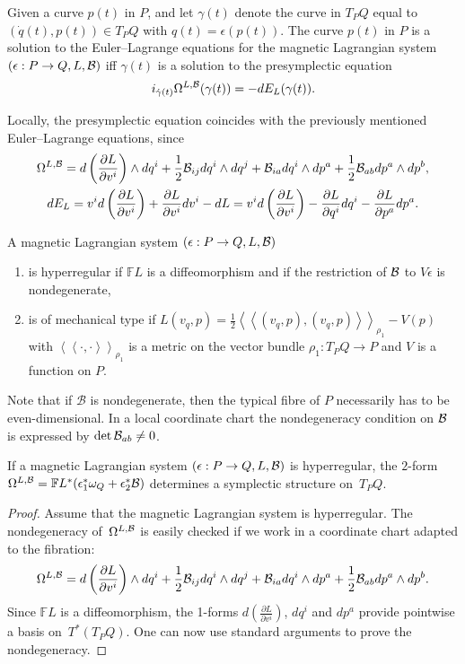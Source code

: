 \documentclass[pdftex]{sigma}
\renewcommand{\ll}{\left<\!\left<}
\renewcommand{\gg}{\right>\!\right>}
\newcommand{\B}{{\cal B}}
\newcommand{\e}{\epsilon}
\def\fpd#1#2{\frac{\partial #1}{\partial #2}}
\newcommand{\F}{\mathbb{F}}
\begin{document}
\begin{proposition}\label{def:el} Given a curve $p(t)$ in $P$, and let $\gamma(t)$ denote the curve in $T_PQ$ equal to $(\dot q(t), p(t))\in T_PQ$ with $q(t)=\e(p(t))$. The curve $p(t)$ in $P$ is a solution to the Euler--Lagrange equations for the magnetic Lagrangian system $(\e:P\to Q,L,\B)$ iff  $\gamma(t)$ is a solution to the presymplectic equation
\[i_{\dot \gamma(t)} \Omega^{L,\B} (\gamma(t)) = -dE_L(\gamma(t)).\]
\end{proposition}
Locally, the presymplectic equation coincides with the previously mentioned Euler--Lagrange equations, since
\begin{gather*}
\Omega^{L,\B}  = d\left(\fpd{L}{v^i} \right)\wedge d q^i + \frac12 \B_{ij} dq^i \wedge dq^j + \B_{ia}dq^i\wedge dp^a + \frac12 \B_{ab} dp^a\wedge dp^b,\\
 dE_L   =v^i d\left(\fpd{L}{v^i} \right) + \fpd{L}{v^i} dv^i - dL=v^i d\left(\fpd{L}{v^i} \right) - \fpd{L}{q^i} dq^i - \fpd{L}{p^a} dp^a.
\end{gather*}

\begin{definition}A magnetic Lagrangian system $(\e:P\to Q,L,\B)$
\begin{enumerate}\itemsep=0pt \item[1)] is hyperregular if $\F L$ is  a dif\/feomorphism and if the restriction of $\B$ to $V\e$ is nondegenerate,
 \item[2)] is of mechanical type if $L(v_q,p)= \frac12 \ll (v_q,p) ,(v_q,p)\gg_{\rho_1}- V(p)$ with $\ll \cdot , \cdot \gg_{\rho_1}$ is a metric on the vector bundle $\rho_1:T_PQ \to P$ and $V$ is a function on $P$. \end{enumerate}
\end{definition}

Note that if $\mathcal{B}$ is nondegenerate, then the typical f\/ibre of $P$ necessarily has to be even-dimensional.
In a local coordinate chart the nondegeneracy condition on $\B$ is expressed by $\det \B_{ab}\neq0$.
\begin{proposition} If a magnetic Lagrangian system $(\e:P\to Q,L,\B)$ is hyperregular, the $2$-form $\Omega^{L,\B} = \F L^*(\e^*_1\omega_{Q} +\e^*_2\B)$ determines a symplectic structure on~$T_PQ$.
\end{proposition}
\begin{proof}
Assume that the magnetic Lagrangian system is hyperregular. The nondegeneracy of~$\Omega^{L,\B}$ is easily checked if we work in a coordinate chart adapted to the f\/ibration:
\[
\Omega^{L,\B} = d\left(\fpd{L}{v^i} \right)\wedge d q^i + \frac12 \B_{ij} dq^i \wedge dq^j + \B_{ia}dq^i\wedge dp^a + \frac12 \B_{ab} dp^a\wedge dp^b.
\]
Since $\F L$ is a dif\/feomorphism, the 1-forms $d\left(\fpd{L}{v^i} \right)$, $dq^i$ and $dp^a$ provide pointwise a basis on~$T^*(T_PQ)$. One can now use standard arguments to prove the nondegeneracy.
\end{proof}
\end{document}
